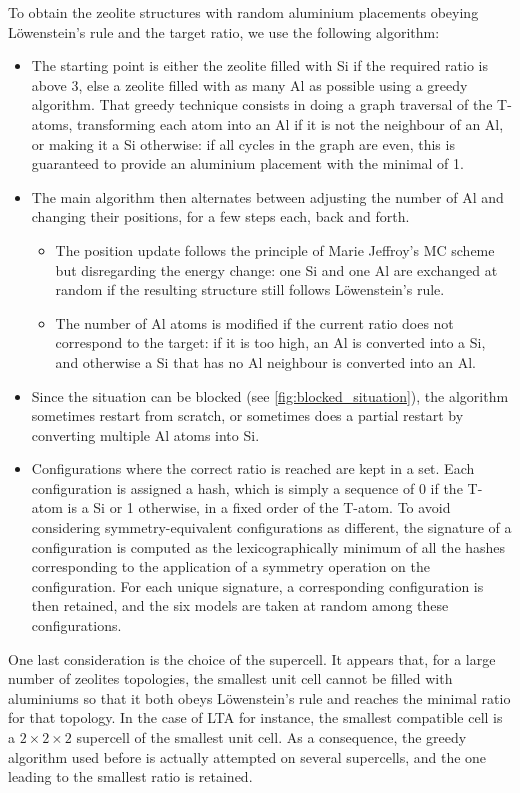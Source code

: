 \documentclass[main.tex]{subfiles}
\begin{document}
To obtain the zeolite structures with random aluminium placements obeying L\"owenstein's rule and the target \SiAl ratio, we use the following algorithm:
\begin{itemize}
    \item The starting point is either the zeolite filled with Si if the required \SiAl ratio is above 3, else a zeolite filled with as many Al as possible using a greedy algorithm. That greedy technique consists in doing a graph traversal of the T-atoms, transforming each atom into an Al if it is not the neighbour of an Al, or making it a Si otherwise: if all cycles in the graph are even, this is guaranteed to provide an aluminium placement with the minimal \SiAl of 1.
    \item The main algorithm then alternates between adjusting the number of Al and changing their positions, for a few steps each, back and forth.
    \begin{itemize}
        \item The position update follows the principle of Marie Jeffroy's MC scheme but disregarding the energy change: one Si and one Al are exchanged at random if the resulting structure still follows L\"owenstein's rule.
        \item The number of Al atoms is modified if the current \SiAl ratio does not correspond to the target: if it is too high, an Al is converted into a Si, and otherwise a Si that has no Al neighbour is converted into an Al.
    \end{itemize}
    \item Since the situation can be blocked (see \cref{fig:blocked_situation}), the algorithm sometimes restart from scratch, or sometimes does a partial restart by converting multiple Al atoms into Si.
    \item Configurations where the correct \SiAl ratio is reached are kept in a set. Each configuration is assigned a hash, which is simply a sequence of 0 if the T-atom is a Si or 1 otherwise, in a fixed order of the T-atom. To avoid considering symmetry-equivalent configurations as different, the signature of a configuration is computed as the lexicographically minimum of all the hashes corresponding to the application of a symmetry operation on the configuration. For each unique signature, a corresponding configuration is then retained, and the six models are taken at random among these configurations.
\end{itemize}\label{aluminiumhash}

One last consideration is the choice of the supercell. It appears that, for a large number of zeolites topologies, the smallest unit cell cannot be filled with aluminiums so that it both obeys L\"owenstein's rule and reaches the minimal \SiAl ratio for that topology. In the case of LTA for instance, the smallest compatible cell is a $2\times2\times2$ supercell of the smallest unit cell. As a consequence, the greedy algorithm used before is actually attempted on several supercells, and the one leading to the smallest \SiAl ratio is retained.
\end{document}
